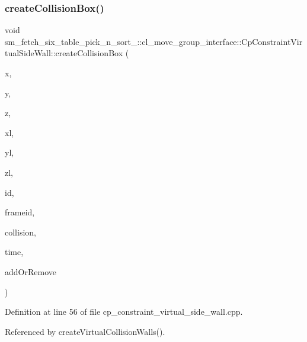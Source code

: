 \subsubsection{\texorpdfstring{create\+Collision\+Box()}{createCollisionBox()}}
{\footnotesize\ttfamily void sm\+\_\+fetch\+\_\+six\+\_\+table\+\_\+pick\+\_\+n\+\_\+sort\+\_\+::cl\+\_\+move\+\_\+group\+\_\+interface\+::\+Cp\+Constraint\+Virtual\+Side\+Wall\+::create\+Collision\+Box (\begin{DoxyParamCaption}\item[{float}]{x,  }\item[{float}]{y,  }\item[{float}]{z,  }\item[{float}]{xl,  }\item[{float}]{yl,  }\item[{float}]{zl,  }\item[{std\+::string}]{id,  }\item[{std\+::string}]{frameid,  }\item[{moveit\+\_\+msgs\+::\+Collision\+Object \&}]{collision,  }\item[{const ros\+::\+Time \&}]{time,  }\item[{int}]{add\+Or\+Remove }\end{DoxyParamCaption})}



Definition at line 56 of file cp\+\_\+constraint\+\_\+virtual\+\_\+side\+\_\+wall.\+cpp.



Referenced by create\+Virtual\+Collision\+Walls().



